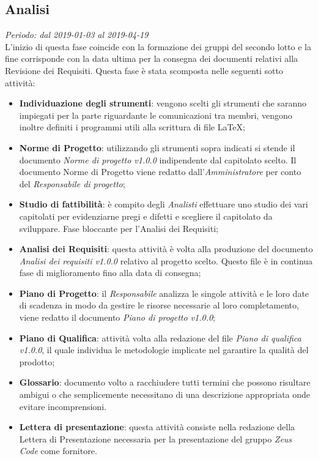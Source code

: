 \subsection{Analisi}
\textit{Periodo: dal 2019-01-03 al 2019-04-19}\\
L'inizio di questa fase coincide con la formazione dei gruppi del secondo lotto e la fine corrisponde con la data ultima per la consegna dei documenti relativi alla Revisione dei Requisiti.
Questa fase è stata scomposta nelle seguenti sotto attività:
\begin{itemize}
	\item \textbf{Individuazione degli strumenti}: vengono scelti gli strumenti che saranno impiegati per la parte riguardante le comunicazioni tra membri, vengono inoltre definiti i programmi utili alla scrittura di file \LaTeX; 
	\item \textbf{Norme di Progetto}: utilizzando gli strumenti sopra indicati si stende il documento \textit{Norme di progetto v1.0.0} indipendente dal capitolato scelto. Il documento Norme di Progetto viene redatto dall'\textit{Amministratore} per conto del \textit{Responsabile di progetto};
	\item \textbf{Studio di fattibilità}: è compito degli \textit{Analisti} effettuare uno studio dei vari capitolati per evidenziarne pregi e difetti e scegliere il capitolato da sviluppare. Fase bloccante per l'Analisi dei Requisiti;
	\item \textbf{Analisi dei Requisiti}: questa attività è volta alla produzione del documento \textit{Analisi dei requisiti v1.0.0} relativo al progetto scelto. Questo file è in continua fase di miglioramento fino alla data di consegna;
	\item \textbf{Piano di Progetto}: il \textit{Responsabile} analizza le singole attività e le loro date di scadenza in modo da gestire le risorse necessarie al loro completamento, viene redatto il documento \textit{Piano di progetto v1.0.0};
	\item \textbf{Piano di Qualifica}: attività volta alla redazione del file \textit{Piano di qualifica v1.0.0}, il quale individua le metodologie implicate nel garantire la qualità del prodotto; 
	\item \textbf{Glossario}: documento volto a racchiudere tutti termini che possono risultare ambigui o che semplicemente necessitano di una descrizione appropriata onde evitare incomprensioni.
	\item \textbf{Lettera di presentazione}: questa attività consiste nella redazione della Lettera di Presentazione necessaria  per  la  presentazione del gruppo \textit{Zeus Code} come fornitore.
\end{itemize}
